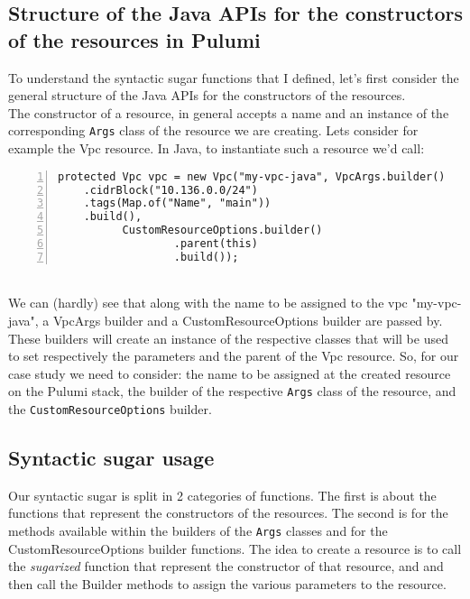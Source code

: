 \subsection{Structure of the Java APIs for the constructors of the resources in Pulumi}
To understand the syntactic sugar functions that I defined, let's first consider the general structure of the Java APIs for the constructors of the resources.\\
The constructor of a resource, in general accepts a name and an instance of the corresponding \texttt{Args} class of the resource we are creating.
Lets consider for example the Vpc resource.
In Java, to instantiate such a resource we'd call:
\begin{lstlisting}[numbers=left, numberstyle=\tiny, numbersep=-5pt, stepnumber=1]
  protected Vpc vpc = new Vpc("my-vpc-java", VpcArgs.builder()
    .cidrBlock("10.136.0.0/24")
    .tags(Map.of("Name", "main"))
    .build(),
          CustomResourceOptions.builder()
                  .parent(this)
                  .build());
\end{lstlisting}\mbox{}\\
We can (hardly) see that along with the name to be assigned to the vpc "my-vpc-java", a VpcArgs builder and a CustomResourceOptions builder are passed by.
These builders will create an instance of the respective classes that will be used to set respectively the parameters and the parent of the Vpc resource.
So, for our case study we need to consider: the name to be assigned at the created resource on the Pulumi stack, the builder of the respective \texttt{Args} class of the resource, and the \texttt{CustomResourceOptions} builder.


\subsection{Syntactic sugar usage}
\label{ssec:syn-sug-usage}
Our syntactic sugar is split in 2 categories of functions.
The first is about the functions that represent the constructors of the resources.
The second is for the methods available within the builders of the \texttt{Args} classes and for the CustomResourceOptions builder functions.
The idea to create a resource is to call the \textit{sugarized} function that represent the constructor of that resource, and and then call the Builder methods to assign the various parameters to the resource.

